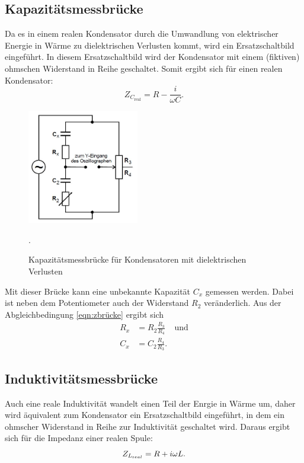 \subsection{Kapazitätsmessbrücke}
Da es in einem realen Kondensator durch die Umwandlung von elektrischer Energie in
Wärme zu dielektrischen Verlusten kommt, wird ein Ersatzschaltbild eingeführt.
In diesem Ersatzschaltbild wird der Kondensator mit einem (fiktiven) ohmschen Widerstand
in Reihe geschaltet. Somit ergibt sich für einen realen Kondensator:
\begin{equation*}
  Z_{C_{\text{real}}}=R-\frac{i}{\omega C}.
  \label{eqn:zcreal}
\end{equation*}
\begin{figure}[H]
  \centering
  \includegraphics[height=5cm]{kapazitat.JPG}
  \caption{Kapazitätsmessbrücke für Kondensatoren mit dielektrischen Verlusten}
  \label{fig:kapazitat}
  \cite{skript}.
\end{figure}
\noindent Mit dieser Brücke kann eine unbekannte Kapazität $C_{x}$ gemessen werden.
Dabei ist neben dem Potentiometer auch der Widerstand
$R_{2}$ veränderlich.
Aus der Abgleichbedingung \ref{eqn:zbrücke} ergibt sich
\begin{align}
  R_{x} &=R_{2}\frac{R_{3}}{R_{4}} \;\;\;\;\text{und} \\
  C_{x} &=C_{2}\frac{R_{4}}{R_{3}}.
  \label{eqn:cx}
\end{align}

\subsection{Induktivitätsmessbrücke}
 Auch eine reale Induktivität wandelt einen Teil der Enrgie in Wärme um, daher wird äquivalent
 zum Kondensator ein Ersatzschaltbild eingeführt, in dem ein ohmscher Widerstand in Reihe
 zur Induktivität geschaltet wird.
 Daraus ergibt sich für die Impedanz einer realen Spule:
 \begin{equation}
   Z_{L_{\text real}}= R + i\omega L.
   \label{zlreal}
 \end{equation}

